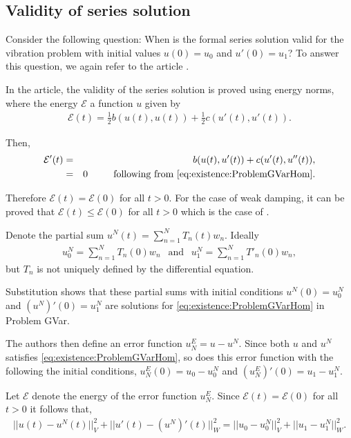 	\subsection*{Validity of series solution}
		Consider the following question: When is the formal series solution valid for the vibration problem with initial values $u(0) = u_0$ and $u'(0) = u_1$? To answer this question, we again refer to the article \cite{CVV18}.

		In the article, the validity of the series solution is proved using energy norms, where the energy $\mathcal{E}$ a function $u$ given by \label{sym:Energy}
		\begin{eqnarray}
			\mathcal{E} (t) = \frac{1}{2} b(u(t), u(t)) + \frac{1}{2} c(u'(t), u'(t)). \label{eq:1D_Model:ModalAnalysisEnergy}
		\end{eqnarray}

		Then,
		\begin{eqnarray*}
			\mathcal{E}'(t) & = & b(u(t), u'(t)) + c(u'(t), u''(t)),\\
							& = & 0 \ \ \ \ \ \ \ \textrm{ following from \eqref{eq:existence:ProblemGVarHom}}. 
		\end{eqnarray*}

		Therefore $\mathcal{E}(t) = \mathcal{E}(0)$ for all $t>0$. For the case of weak damping, it can be proved that $\mathcal{E}(t) \leq \mathcal{E}(0)$ for all $t>0$ which is the case of \cite{CVV18}.

		Denote the partial sum $u^{N}(t) = \sum_{n=1}^{N} T_{n}(t)w_n$. Ideally
		\begin{eqnarray*}
			u_0^{N} = \sum_{n=1}^{N} T_n(0) w_n \ \ \textrm{ and } \ \ u_{1}^{N} =\sum_{n=1}^{N} T'_n(0) w_n,
		\end{eqnarray*}
		but $T_n$ is not uniquely defined by the differential equation.

		Substitution shows that these partial sums with initial conditions $u^N(0) = u^N_0$ and $(u^N)'(0) = u^N_1$ are solutions for \eqref{eq:existence:ProblemGVarHom} in Problem GVar.

		The authors then define an error function $u^E_N = u - u^N$. Since both $u$ and $u^N$ satisfies \eqref{eq:existence:ProblemGVarHom}, so does this error function with the following the initial conditions, $u^E_N(0) = u_0 - u^N_0$ and $(u^E_N)'(0) = u_1 - u^N_1$.

		Let $\mathcal{E}$ denote the energy of the error function $u^E_N$. Since $\mathcal{E}(t) = \mathcal{E}(0)$ for all $t>0$ it follows that, 
		\begin{eqnarray}
			||u(t) -  u^N(t)||_V^2 + ||u'(t) - (u^N)'(t)||^2_W = ||u_0 - u^N_0||_V^2 + ||u_1 - u^N_1||_W^2. \label{eq:inequality}
		\end{eqnarray}

